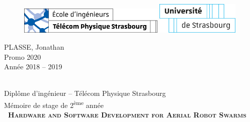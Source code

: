 \begin{titlepage}

 \begin{figure}
  \includegraphics[width=7cm]{logos/tps_logo.png}
  \hfill
  \includegraphics[width=4cm]{logos/unistra_logo.png}
 \end{figure}

 \hfill
 \begin{minipage}{3cm}
  \begin{flushright}
   \vspace{3cm}
   PLASSE, Jonathan\\
   Promo 2020\\
   Année 2018 -- 2019
  \end{flushright}
 \end{minipage}

 \vspace{3.5cm}

 \begin{center}
  \hrulefill \\
  \vspace{0.3cm}
  \Large{Diplôme d’ingénieur -- Télécom Physique Strasbourg\\
   Mémoire de stage de 2\textsuperscript{ème} année
  }\\
  \vspace{0,2cm}
  \textsc{\textbf{\guillemotleft \ \normalsize{\textbf{\large{Hardware and Software Development for Aerial Robot Swarms}}} \ \Large{\guillemotright}}} \\
  \hrulefill

  \vspace{0.7cm}
 \end{center}


\end{titlepage}
